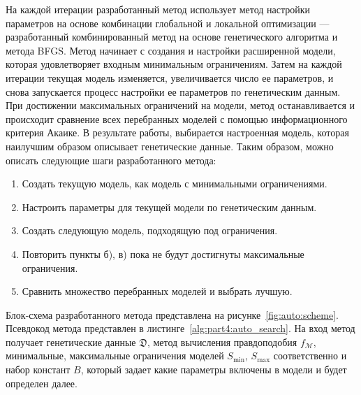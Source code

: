 На каждой итерации разработанный метод использует метод настройки параметров на основе комбинации глобальной и локальной оптимизации --- разработанный комбинированный метод на основе генетического алгоритма и метода BFGS.
Метод начинает с создания и настройки расширенной модели, которая удовлетворяет входным минимальным ограничениям.
Затем на каждой итерации текущая модель изменяется, увеличивается число ее параметров, и снова запускается процесс настройки ее параметров по генетическим данным.
При достижении максимальных ограничений на модели, метод останавливается и происходит сравнение всех перебранных моделей с помощью информационного критерия Акаике.
В результате работы, выбирается настроенная модель, которая наилучшим образом описывает генетические данные.
Таким образом, можно описать следующие шаги разработанного метода:
\begin{enumerate}
    \item Создать текущую модель, как модель с минимальными ограничениями.
    \item Настроить параметры для текущей модели по генетическим данным.
    \item Создать следующую модель, подходящую под ограничения.
    \item Повторить пункты б), в) пока не будут достигнуты максимальные ограничения.
    \item Сравнить множество перебранных моделей и выбрать лучшую.\\
\end{enumerate}
Блок-схема разработанного метода представлена на рисунке~\ref{fig:auto:scheme}.
Псевдокод метода представлен в листинге~\ref{alg:part4:auto_search}.
На вход метод получает генетические данные $\mathfrak{D}$, метод вычисления правдоподобия $f_{\mathcal{M}}$, минимальные, максимальные ограничения моделей $S_{\min}$, $S_{\max}$ соответственно и набор констант $B$, который задает какие параметры включены в модели и будет определен далее.\\

